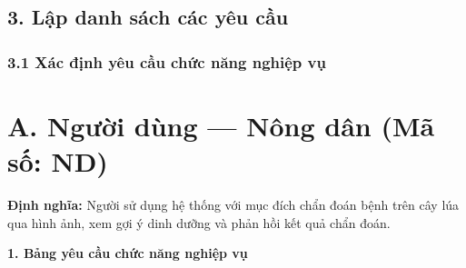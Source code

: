 ﻿\documentclass[12pt,a4paper]{article}
\begin{document}
\hrulefill

\subsection*{3. Lập danh sách các yêu cầu}
\subsubsection*{3.1 Xác định yêu cầu chức năng nghiệp vụ}

\section*{A. Người dùng --- Nông dân (Mã số: ND)}

\textbf{Định nghĩa:} Người sử dụng hệ thống với mục đích chẩn đoán bệnh trên cây lúa qua hình ảnh, xem gợi ý dinh dưỡng và phản hồi kết quả chẩn đoán.

\vspace{0.3cm}
\textbf{1. Bảng yêu cầu chức năng nghiệp vụ}
\end{document}
